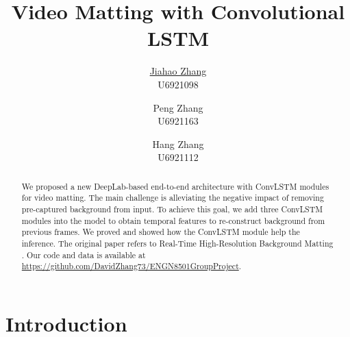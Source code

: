 \documentclass[final]{cvpr}
\begin{document}
\title{Video Matting with Convolutional LSTM}
\author{\underline{Jiahao Zhang} \\ U6921098 \and Peng Zhang \\ U6921163 \and Hang Zhang \\ U6921112}

\maketitle
\begin{abstract}
    We proposed a new DeepLab-based end-to-end architecture with ConvLSTM modules for video matting. The main challenge is alleviating the negative impact of removing pre-captured background from input. To achieve this goal, we add three ConvLSTM modules into the model to obtain temporal features to re-construct background from previous frames. We proved and showed how the ConvLSTM module help the inference. The original paper refers to Real-Time High-Resolution Background Matting \cite{linRealTimeHighResolutionBackground2020a}. Our code and data
    is available at \href{https://github.com/DavidZhang73/ENGN8501GroupProject}{https://github.com/DavidZhang73/ENGN8501GroupProject}.
\end{abstract}

\section{Introduction}
\end{document}
